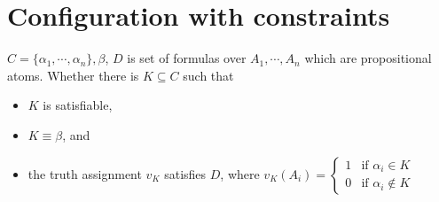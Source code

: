 \documentclass[12pt]{article}
\begin{document}
\section{Configuration with constraints}

$C=\{\alpha_1,\cdots, \alpha_n\}, \beta$,
$D$ is set of formulas over $A_1,\cdots, A_n$ which are propositional atoms.
Whether there is $K\subseteq C$ such that 
\begin{itemize}
\item $K$ is satisfiable,
\item $K\equiv\beta$, and
\item the truth assignment $v_K$ satisfies $D$, where $v_K(A_i)=\left\{\begin{array}{ll}
1 & \text{if } \alpha_i\in K\\ 0 & \text{if }\alpha_i\not\in K\end{array}\right.$  

\end{itemize}
\end{document}
